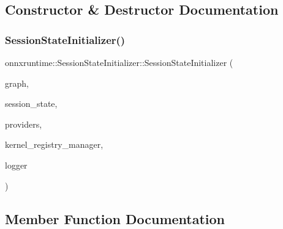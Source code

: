 \subsection{Constructor \& Destructor Documentation}
\mbox{\label{classonnxruntime_1_1SessionStateInitializer_abc08054b3b6ad95966c05cefc036f63a}} 
\subsubsection{\texorpdfstring{Session\+State\+Initializer()}{SessionStateInitializer()}}
{\footnotesize\ttfamily onnxruntime\+::\+Session\+State\+Initializer\+::\+Session\+State\+Initializer (\begin{DoxyParamCaption}\item[{\mbox{\hyperlink{classonnxruntime_1_1Graph}{onnxruntime\+::\+Graph}} \&}]{graph,  }\item[{\mbox{\hyperlink{classonnxruntime_1_1SessionState}{Session\+State}} \&}]{session\+\_\+state,  }\item[{const \mbox{\hyperlink{classonnxruntime_1_1ExecutionProviders}{Execution\+Providers}} \&}]{providers,  }\item[{\mbox{\hyperlink{classonnxruntime_1_1KernelRegistryManager}{Kernel\+Registry\+Manager}} \&}]{kernel\+\_\+registry\+\_\+manager,  }\item[{const \mbox{\hyperlink{classonnxruntime_1_1logging_1_1Logger}{logging\+::\+Logger}} \&}]{logger }\end{DoxyParamCaption})}



\subsection{Member Function Documentation}
\mbox{\label{classonnxruntime_1_1SessionStateInitializer_a754eb7134790957b684b9131c010f3f7}} 
